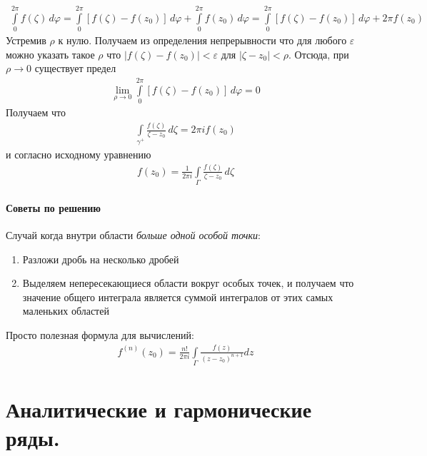 \documentclass[12pt]{extarticle}
\renewcommand{\d}{\,d}
\begin{document}
\begin{eqnarray*}
    \int\limits_{0}^{2\pi}f(\zeta)\d{\varphi}
    =\int\limits_{0}^{2\pi}[f(\zeta)-f(z_{0})]\d{\varphi}
    +\int\limits_{0}^{2\pi}f(z_{0})\d{\varphi}
    =\int\limits_{0}^{2\pi}[f(\zeta)-f(z_{0})]\d{\varphi}+2\pi f(z_{0})
\end{eqnarray*}
Устремив $\rho$ к нулю. Получаем из определения непрерывности что для
любого $\varepsilon$ можно указать такое $\rho$ что
$|f(\zeta)-f(z_{0})|<\varepsilon$ для $|\zeta-z_{0}|<\rho$. Отсюда, при
$\rho\to 0$ существует предел
\begin{eqnarray*}
    \lim\limits_{\rho\rightarrow
    0}\int\limits_{0}^{2\pi}[f(\zeta)-f(z_{0})]\d{\varphi}=0
\end{eqnarray*}
Получаем что
\begin{eqnarray*}
    \int\limits_{\gamma^{+}}\frac{f(\zeta)}{\zeta-z_{0}}\d{\zeta}
    =2\pi if(z_{0})
\end{eqnarray*}
и согласно исходному уравнению
\begin{eqnarray*}
    f(z_{0})=\frac{1}{2\pi
    i}\int\limits_{\Gamma}\frac{f(\zeta)}{\zeta-z_{0}}\d{\zeta}
\end{eqnarray*}

\paragraph{Советы по решению}
\par Случай когда внутри области \textit{больше одной особой точки}:
\begin{enumerate}
    \itemsep0em
    \item Разложи дробь на несколько дробей
    \item Выделяем непересекающиеся области вокруг особых точек, и
        получаем что значение общего интеграла является суммой
        интегралов от этих самых маленьких областей
\end{enumerate}

\par Просто полезная формула для вычислений:
\begin{eqnarray*}
    f^{(n)}(z_{0})=\frac{n!}{2\pi i}\int\limits_{\Gamma}
    \frac{f(z)}{(z-z_{0})^{n+1}}dz
\end{eqnarray*}


\section{Аналитические и гармонические ряды.}
\end{document}
